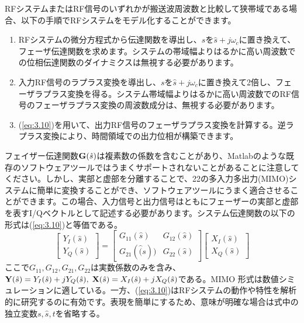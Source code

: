 \documentclass[book]{jlreq}
\begin{document}
RFシステムまたはRF信号のいずれかが搬送波周波数と比較して狭帯域である場合、以下の手順でRFシステムをモデル化することができます。
%
\begin{enumerate}
    \item RFシステムの微分方程式から伝達関数を導出し、$s$を$\hat{s}+j\omega_c$に置き換えて、フェーザ伝達関数を求めます。システムの帯域幅よりはるかに高い周波数での位相伝達関数のダイナミクスは無視する必要があります。
    \item 入力RF信号のラプラス変換を導出し、$s$を$\hat{s}+j\omega_c$に置き換えて2倍し、フェーザラプラス変換を得る。システム帯域幅よりはるかに高い周波数でのRF信号のフェーザラプラス変換の周波数成分は、無視する必要があります。
    \item (\ref{eq:3.10})を用いて、出力RF信号のフェーザラプラス変換を計算する。逆ラプラス変換により、時間領域での出力位相が構築できます。
\end{enumerate}
%
フェイザー伝達関数$\vb{G}(\hat{s})$は複素数の係数を含むことがあり、Matlabのような既存のソフトウェアツールではうまくサポートされないことがあることに注意してください。しかし、実部と虚部を分離することで、2\times2の多入力多出力(MIMO)システムに簡単に変換することができ、ソフトウェアツールにうまく適合させることができます。この場合、入力信号と出力信号はともにフェーザーの実部と虚部を表すI/Qベクトルとして記述する必要があります。システム伝達関数の以下の形式は(\ref{eq:3.10})と等価である。
%
\begin{equation}
    \begin{bmatrix}
        Y_I(\hat{s})\\
        Y_Q(\hat{s})
    \end{bmatrix}
    =
    \begin{bmatrix}
        G_{11}(\hat{s}) & G_{12}(\hat{s}) \\
        G_{21}(\hat(s)) & G_{22}(\hat{s})
    \end{bmatrix}
    \begin{bmatrix}
        X_I(\hat{s}) \\
        X_Q(\hat{s})
    \end{bmatrix}
    \label{eq:3.11}
\end{equation}
%
ここで$G_{11}, G_{12}, G_{21}, G_{22}$は実数係数のみを含み、$\vb{Y}(\hat{s}) = Y_I(\hat{s}) + j Y_Q(\hat{s}), \; \vb{X}(\hat{s}) = X_I(\hat{s}) + j X_Q(\hat{s})$である。MIMO 形式は数値シミュレーションに適している。一方、(\ref{eq:3.10})はRFシステムの動作や特性を解析的に研究するのに有効です。表現を簡単にするため、意味が明確な場合は式中の独立変数$s, \hat{s}, t$を省略する。
\end{document}
